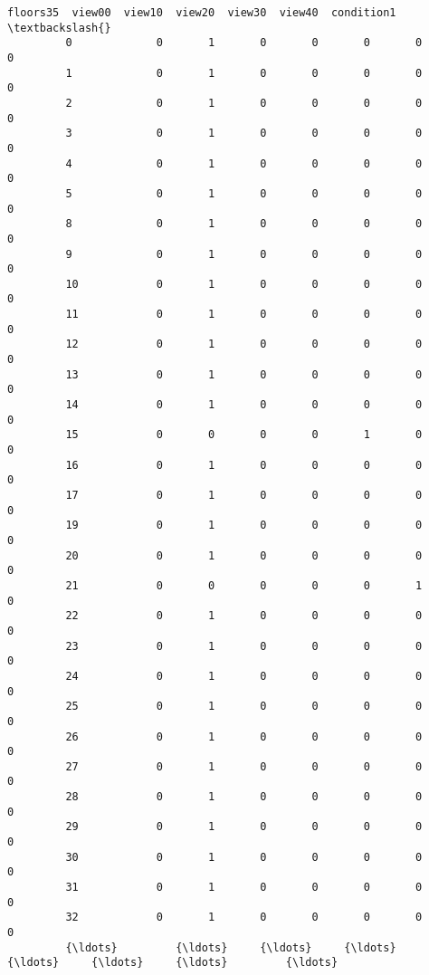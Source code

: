 \documentclass[11pt]{article}
\begin{document}
\begin{Verbatim}[commandchars=\\\{\}]
                floors35  view00  view10  view20  view30  view40  condition1  \textbackslash{}
         0             0       1       0       0       0       0           0   
         1             0       1       0       0       0       0           0   
         2             0       1       0       0       0       0           0   
         3             0       1       0       0       0       0           0   
         4             0       1       0       0       0       0           0   
         5             0       1       0       0       0       0           0   
         8             0       1       0       0       0       0           0   
         9             0       1       0       0       0       0           0   
         10            0       1       0       0       0       0           0   
         11            0       1       0       0       0       0           0   
         12            0       1       0       0       0       0           0   
         13            0       1       0       0       0       0           0   
         14            0       1       0       0       0       0           0   
         15            0       0       0       0       1       0           0   
         16            0       1       0       0       0       0           0   
         17            0       1       0       0       0       0           0   
         19            0       1       0       0       0       0           0   
         20            0       1       0       0       0       0           0   
         21            0       0       0       0       0       1           0   
         22            0       1       0       0       0       0           0   
         23            0       1       0       0       0       0           0   
         24            0       1       0       0       0       0           0   
         25            0       1       0       0       0       0           0   
         26            0       1       0       0       0       0           0   
         27            0       1       0       0       0       0           0   
         28            0       1       0       0       0       0           0   
         29            0       1       0       0       0       0           0   
         30            0       1       0       0       0       0           0   
         31            0       1       0       0       0       0           0   
         32            0       1       0       0       0       0           0   
         {\ldots}         {\ldots}     {\ldots}     {\ldots}     {\ldots}     {\ldots}     {\ldots}         {\ldots}   

\end{Verbatim}
\end{document}
